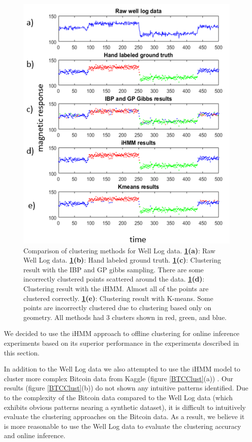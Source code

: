 \documentclass{article}
\begin{document}
\begin{figure}[ht]
\vskip 0.2in
\begin{center}
\centerline{\includegraphics[width=\columnwidth]{OFClust}}
\caption{Comparison of clustering methods for Well Log data. \textbf{\ref{OFClust}(a)}: Raw Well Log data. \textbf{\ref{OFClust}(b)}: Hand labeled ground truth. \textbf{\ref{OFClust}(c)}: Clustering result with the IBP and GP gibbs sampling. There are some incorrectly clustered points scattered around the data. \textbf{\ref{OFClust}(d)}: Clustering result with the iHMM. Almost all of the points are clustered correctly. \textbf{\ref{OFClust}(e)}: Clustering result with K-means. Some points are incorrectly clustered due to clustering based only on geometry. All methods had 3 clusters shown in red, green, and blue.}
\label{OFClust}
\end{center}
\vskip -0.2in
\end{figure} 

We decided to use the iHMM approach to offline clustering for online inference experiments based on its superior performance in the experiments described in this section. 

In addition to the Well Log data we also attempted to use the iHMM model to cluster more complex Bitcoin data from Kaggle (figure \ref{BTCClust}(a)) \cite{KaggleBit}. Our results (figure \ref{BTCClust}(b)) do not shown any intuitive patterns identified. Due to the complexity of the Bitcoin data compared to the Well Log data (which exhibits obvious patterns nearing a synthetic dataset), it is difficult to intuitively evaluate the clustering approaches on the Bitcoin data. As a result, we believe it is more reasonable to use the Well Log data to evaluate the clustering accuracy and online inference.
\end{document}
